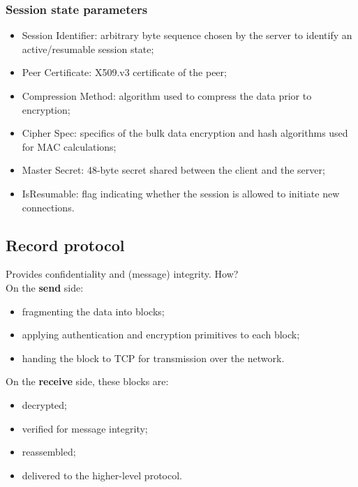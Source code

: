 \documentclass[a4paper, 10pt, titlepage]{article}
\begin{document}
\subsubsection{Session state parameters}
\begin{itemize}
\item Session Identifier: arbitrary byte sequence chosen by the server to identify an active/resumable session state;
\item Peer Certificate: X509.v3 certificate of the peer;
\item Compression Method: algorithm used to compress the data prior to encryption;
\item Cipher Spec: specifics of the bulk data encryption and hash algorithms used for MAC calculations;
\item Master Secret: 48-byte secret shared between the client and the server;
\item IsResumable: flag indicating whether the session is allowed to initiate new connections.
\end{itemize}

\subsection{Record protocol}
Provides confidentiality and (message) integrity. How? \medskip\\
On the \textbf{send} side:
\begin{itemize}
\item fragmenting the data into blocks;
\item applying authentication and encryption primitives to each block;
\item handing the block to TCP for transmission over the network.
\end{itemize}
On the \textbf{receive} side, these blocks are:
\begin{itemize}
\item decrypted;
\item verified for message integrity;
\item reassembled;
\item delivered to the higher-level protocol.
\end{itemize}
\end{document}
